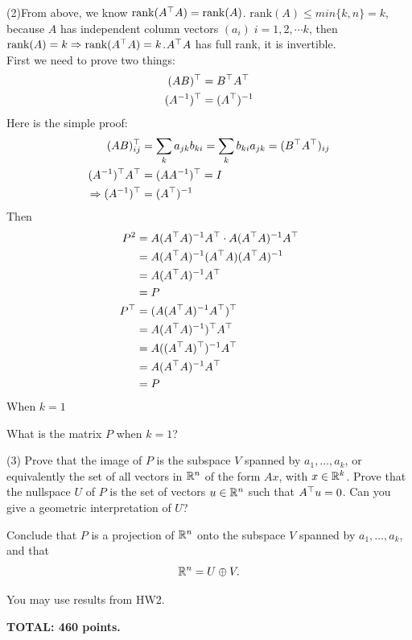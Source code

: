 \documentclass[12pt]{article}
\begin{document}
\medskip
(2)From above, we know $\mathrm{rank}(A^{\top} A) = \mathrm{rank}(A)$. $\mathrm{rank}(A) \leq min \{k, n\} = k$, because $A$ has independent column vectors $(a_i)\; i = 1,2, \cdots k$, then $\mathrm{rank}(A) = k \Rightarrow \mathrm{rank}(A^{\top} A) = k$.$A^{\top} A$ has full rank, it is invertible. \\
First we need to prove two things:
\begin{align*}
(AB)^{\top} &= B^{\top} A^{\top} \\
(A^{-1})^{\top} &= (A^{\top})^{-1}
\end{align*}
Here is the simple proof:
\begin{align*}
(AB)^{\top}_{ij} &= \sum_k a_{jk}b_{ki} = \sum_k b_{ki}a_{jk} = (B^{\top} A^{\top})_{ij} \\
(A^{-1})^{\top} A^{\top} &= (A A^{-1})^{\top} = I \\
\Rightarrow (A^{-1})^{\top} &= (A^{\top})^{-1}
\end{align*}
Then 
\begin{align*}
P^2 &= A(A^{\top}A)^{-1} A^{\top} \cdot A(A^{\top}A)^{-1} A^{\top} \\
&= A(A^{\top}A)^{-1} (A^{\top} A)(A^{\top}A)^{-1} \\
&= A(A^{\top}A)^{-1} A^{\top} \\
&= P \\
P^{\top} &= ( A ( A^{\top} A)^{-1} A^{\top})^{\top} \\
&=  A (A^{\top}A)^{-1})^{\top} A^{\top} \\
&= A ((A^{\top}A)^{\top})^{-1} A^{\top} \\
&= A(A^{\top}A)^{-1} A^{\top} \\
&= P
\end{align*}
When $k=1$

What is the matrix $P$ when $k = 1$?

\medskip
(3)
Prove that the image of $P$ is the subspace $V$ spanned by
$a_1, \ldots, a_k$, or equivalently the set of all vectors in $\mathbb{R}^n$
of the form $A x$, with $x\in \mathbb{R}^k$.
Prove that the nullspace $U$ of $P$ is the set  of vectors $u\in
\mathbb{R}^n$  such that
$A^{\top} u = 0$.
Can you give a geometric interpretation of $U$?

\medskip
Conclude that $P$ is a projection of $\mathbb{R}^n$ onto the
subspace $V$ spanned by $a_1, \ldots, a_k$, and that
\[
\mathbb{R}^n = U \oplus V.
\]

\hint 
You may use results  from HW2.

\vspace{0.5cm}\noindent
{\bf TOTAL:  460 points.}
\end{document}
